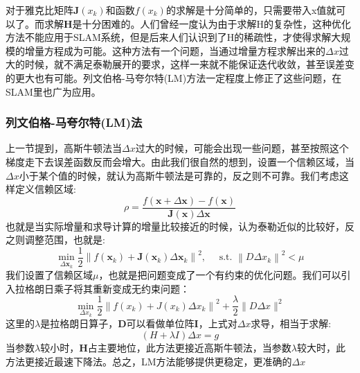 对于雅克比矩阵$\boldsymbol{J}(x_k)$和函数$f(x_k)$的求解是十分简单的，只需要带入x值就可以了。而求解$\boldsymbol{H}$是十分困难的。人们曾经一度认为由于求解H的复杂性，这种优化方法不能应用于SLAM系统，但是后来人们认识到了H的稀疏性，才使得求解大规模的增量方程成为可能。这种方法有一个问题，当通过增量方程求解出来的$\Delta x$过大的时候，就不满足泰勒展开的要求，这样一来就不能保证迭代收敛，甚至误差变的更大也有可能。列文伯格-马夸尔特(LM)方法一定程度上修正了这些问题，在SLAM里也广为应用。
\subsubsection{列文伯格-马夸尔特(LM)法}
上一节提到，高斯牛顿法当$\Delta x$过大的时候，可能会出现一些问题，甚至按照这个梯度走下去误差函数反而会增大。由此我们很自然的想到，设置一个信赖区域，当$\Delta x$小于某个值的时候，就认为高斯牛顿法是可靠的，反之则不可靠。我们考虑这样定义信赖区域:
\begin{equation}
\rho=\frac{f(\boldsymbol{x}+\Delta \boldsymbol{x})-f(\boldsymbol{x})}{\boldsymbol{J}(\boldsymbol{x}) \Delta \boldsymbol{x}}
\end{equation}
也就是当实际增量和求导计算的增量比较接近的时候，认为泰勒近似的比较好，反之则调整范围，也就是:
\begin{equation}
\min _{\Delta \boldsymbol{x}_{k}} \frac{1}{2}\left\|f\left(\boldsymbol{x}_{k}\right)+\boldsymbol{J}\left(\boldsymbol{x}_{k}\right) \Delta \boldsymbol{x}_{k}\right\|^{2}, \quad \text { s.t. }\left\|D \Delta x_{k}\right\|^{2} < \mu
\end{equation}
我们设置了信赖区域$\mu$，也就是把问题变成了一个有约束的优化问题。我们可以引入拉格朗日乘子将其重新变成无约束问题：
\begin{equation}
\min _{\Delta x_{k}} \frac{1}{2}\left\|f\left(x_{k}\right)+J\left(x_{k}\right) \Delta x_{k}\right\|^{2}+\frac{\lambda}{2}\|D \Delta x\|^{2}
\end{equation}
这里的$\lambda$是拉格朗日算子，$\boldsymbol{D}$可以看做单位阵$\boldsymbol{I}$，上式对$\Delta x$求导，相当于求解:
\begin{equation}
(H+\lambda I) \Delta x=g
\end{equation}
当参数$\lambda$较小时，$\boldsymbol{H}$占主要地位，此方法更接近高斯牛顿法，当参数$\lambda$较大时，此方法更接近最速下降法。总之，LM方法能够提供更稳定，更准确的$\Delta x$













